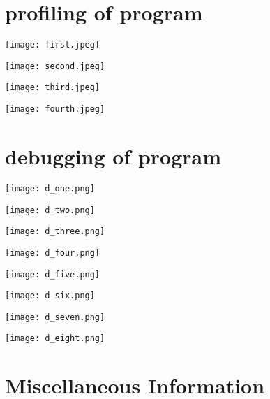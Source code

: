 \documentclass[]{article}
\begin{document}
\newpage
\thispagestyle{others}
\section{profiling of program}
\begin{center}
\texttt{[image: first.jpeg]}
\end{center}
\begin{center}
\texttt{[image: second.jpeg]}
\end{center}
\begin{center}
\texttt{[image: third.jpeg]}
\end{center}
\begin{center}
\texttt{[image: fourth.jpeg]}
\end{center}


\newpage
\thispagestyle{others}
\section{debugging of program}
\begin{center}
\texttt{[image: d\_one.png]}
\end{center}
\begin{center}
\texttt{[image: d\_two.png]}
\end{center}
\begin{center}
\texttt{[image: d\_three.png]}
\end{center}
\begin{center}
\texttt{[image: d\_four.png]}
\end{center}
\begin{center}
\texttt{[image: d\_five.png]}
\end{center}
\begin{center}
\texttt{[image: d\_six.png]}
\end{center}
\begin{center}
\texttt{[image: d\_seven.png]}
\end{center}
\begin{center}
\texttt{[image: d\_eight.png]}
\end{center}

\newpage
\thispagestyle{others}
\section{Miscellaneous Information}
\vspace*{10mm}
\end{document}
